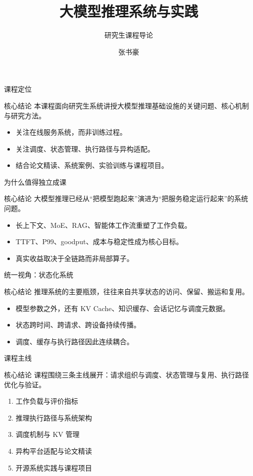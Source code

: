 \documentclass[11pt,aspectratio=169]{ctexbeamer}
\title{大模型推理系统与实践}
\subtitle{研究生课程导论}
\author{张书豪}
\institute{华中科技大学计算机学院}
\date{}
\newcommand{\Core}[1]{
  \begin{block}{核心结论}
    #1
  \end{block}
}
\begin{document}
\begin{frame}[plain]
  \titlepage
\end{frame}

\begin{frame}{课程定位}
  \Core{本课程面向研究生系统讲授大模型推理基础设施的关键问题、核心机制与研究方法。}
  \begin{itemize}
    \item 关注在线服务系统，而非训练过程。
    \item 关注调度、状态管理、执行路径与异构适配。
    \item 结合论文精读、系统案例、实验训练与课程项目。
  \end{itemize}
\end{frame}

\begin{frame}{为什么值得独立成课}
  \Core{大模型推理已经从“把模型跑起来”演进为“把服务稳定运行起来”的系统问题。}
  \begin{itemize}
    \item 长上下文、MoE、RAG、智能体工作流重塑了工作负载。
    \item TTFT、P99、goodput、成本与稳定性成为核心目标。
    \item 真实收益取决于全链路而非局部算子。
  \end{itemize}
\end{frame}

\begin{frame}{统一视角：状态化系统}
  \Core{推理系统的主要瓶颈，往往来自共享状态的访问、保留、搬运和复用。}
  \begin{itemize}
    \item 模型参数之外，还有 KV Cache、知识缓存、会话记忆与调度元数据。
    \item 状态跨时间、跨请求、跨设备持续传播。
    \item 调度、缓存与执行路径因此连续耦合。
  \end{itemize}
\end{frame}

\begin{frame}{课程主线}
  \Core{课程围绕三条主线展开：请求组织与调度、状态管理与复用、执行路径优化与验证。}
  \begin{enumerate}
    \item 工作负载与评价指标
    \item 推理执行路径与系统架构
    \item 调度机制与 KV 管理
    \item 异构平台适配与论文精读
    \item 开源系统实践与课程项目
  \end{enumerate}
\end{frame}
\end{document}
